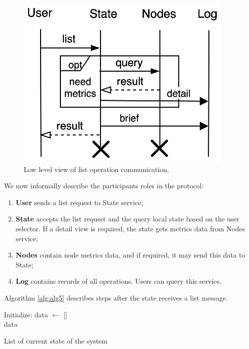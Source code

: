 \begin{figure}[!htbp]
	\begin{center}
		\includegraphics[scale=0.9]{images/FIG4}
	\end{center}
	\vspace{-1.2cm}
	\caption{Low level view of list operation communication.}
	\label{fig:fig8}
\end{figure}

We now informally describe the participants roles in the protocol:\label{list_protocol_informal_description}

\begin{enumerate}[start=1,label={(\bfseries \arabic*)}]
\item \textbf{User} sends a list request to State service;
\item \textbf{State} accepts the list request and the query local state based on the user selector. If a detail view is required, the state gets metrics data from Nodes service;
\item \textbf{Nodes} contain node metrics data, and if required, it may send this data to State;
\item \textbf{Log} contains records of all operations. Users can query this service.
\end{enumerate}

Algorithm \ref{alg:alg5} describes steps after the state receives a list message.

\begin{algorithm}[H]
	\SetAlgoLined
	Initialize: data $\leftarrow$ []\\
	\Return data
	\caption{List of current state of the system}
	\label{alg:alg5}
\end{algorithm}

